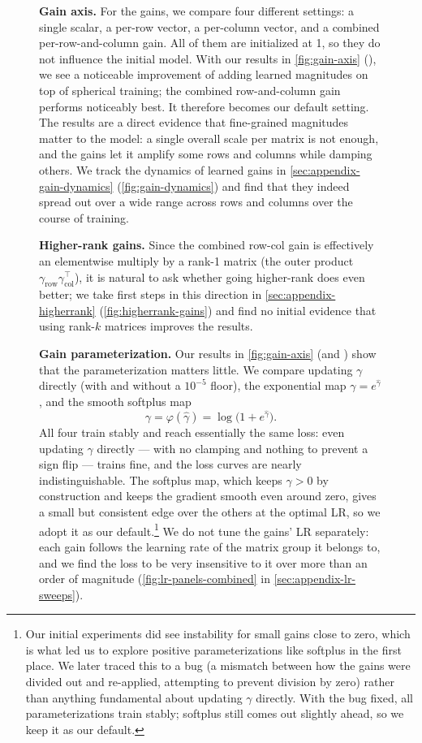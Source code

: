 \documentclass[10pt]{article} %
\newcommand{\grow}{\gamma_{\text{row}}}      %
\newcommand{\gcol}{\gamma_{\text{col}}}      %
\begin{document}
\begin{figure}[t]
\textbf{Gain axis.} For the gains, we compare four different settings: a single scalar, a per-row vector, a per-column vector, and a combined per-row-and-column gain. All of them are initialized at 1, so they do not influence the initial model. With our results in \autoref{fig:gain-axis} (\panelleft), we see a noticeable improvement of adding learned magnitudes on top of spherical training; the combined row-and-column gain performs noticeably best. It therefore becomes our default setting. The results are a direct evidence that fine-grained magnitudes matter to the model: a single overall scale per matrix is not enough, and the gains let it amplify some rows and columns while damping others. We track the dynamics of learned gains in \autoref{sec:appendix-gain-dynamics} (\autoref{fig:gain-dynamics}) and find that they indeed spread out over a wide range across rows and columns over the course of training.

\textbf{Higher-rank gains.} Since the combined row-col gain is effectively an elementwise multiply by a rank-1 matrix (the outer product $\grow\gcol^\top$), it is natural to ask whether going higher-rank does even better; we take first steps in this direction in \autoref{sec:appendix-higherrank} (\autoref{fig:higherrank-gains}) and find no initial evidence that using rank-$k$ matrices improves the results.

\textbf{Gain parameterization.} Our results in \autoref{fig:gain-axis} (\panelcenter and \panelright) show that the parameterization matters little. We compare updating $\gamma$ directly (with and without a $10^{-5}$ floor), the exponential map $\gamma=e^{\widehat{\gamma}}$, and the smooth softplus map
\begin{equation}
\gamma = \varphi(\widehat{\gamma}) = \log\!\big(1 + e^{\widehat{\gamma}}\big).
\end{equation}
All four train stably and reach essentially the same loss: even updating $\gamma$ directly --- with no clamping and nothing to prevent a sign flip --- trains fine, and the loss curves are nearly indistinguishable. The softplus map, which keeps $\gamma > 0$ by construction and keeps the gradient smooth even around zero, gives a small but consistent edge over the others at the optimal LR, so we adopt it as our default.\footnote{Our initial experiments did see instability for small gains close to zero, which is what led us to explore positive parameterizations like softplus in the first place. We later traced this to a bug (a mismatch between how the gains were divided out and re-applied, attempting to prevent division by zero) rather than anything fundamental about updating $\gamma$ directly. With the bug fixed, all parameterizations train stably; softplus still comes out slightly ahead, so we keep it as our default.} We do not tune the gains' LR separately: each gain follows the learning rate of the matrix group it belongs to, and we find the loss to be very insensitive to it over more than an order of magnitude (\autoref{fig:lr-panels-combined} in \autoref{sec:appendix-lr-sweeps}).


\end{figure}
\end{document}

